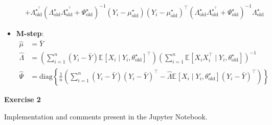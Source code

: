 \documentclass[10pt,notitlepage]{article}
\newcommand{\MBlue}[1]{{\color{MBlue}#1}}
\newcommand{\mean}[2][]{\mathbb{E}_{#1}\left[#2\right]}
\begin{document}
\begin{exercise}[Solution]
\begin{itemize}
\begin{align*}
                        &+\Lambda^{\star^\top}_{\text{old}}\left(\Lambda^\star_{\text{old}}\Lambda^{\star^\top}_{\text{old}}+\Psi^\star_{\text{old}}\right)^{-1}\left(Y_i-\mu^\star_{\text{old}}\right) \left(Y_i-\mu^\star_{\text{old}}\right)^\top \left(\Lambda^\star_{\text{old}}\Lambda^{\star^\top}_{\text{old}}+\Psi^\star_{\text{old}}\right)^{-1}\Lambda^{\star}_{\text{old}}
                    \end{align*}
            \item \textbf{M-step}:
                    \begin{align*}
                        \hat{\mu} &= \bar{Y}\\
                        \hat{\Lambda}&=\left(\sum_{i=1}^{n}\left(Y_i-\bar{Y}\right)\mean{X_i\mid Y_i, \theta^\star_{\text{old}}}^\top\right)\left(\sum_{i=1}^{n}\mean{X_i X_i^\top\mid Y_i, \theta^\star_{\text{old}}}\right)^{-1}\\
                        \hat{\Psi} &= \text{diag}\left\{\frac{1}{n}\left(\sum_{i=1}^{n}\left(Y_i-\bar{Y}\right)\left(Y_i-\bar{Y}\right)^\top - \hat{\Lambda}\mean{X_i\mid Y_i, \theta^\star_{\text{old}}}\left(Y_i-\bar{Y}\right)^\top\right)\right\}
                    \end{align*}
        \end{itemize}
    \end{exercise}

    \newpage
    \textbf{\large \MBlue{Exercise 2}}
    \vskip10pt
    \noindent
	\begin{exercise}[Solution]
        Implementation and comments present in the Jupyter Notebook.
    \end{exercise}
\end{document}
